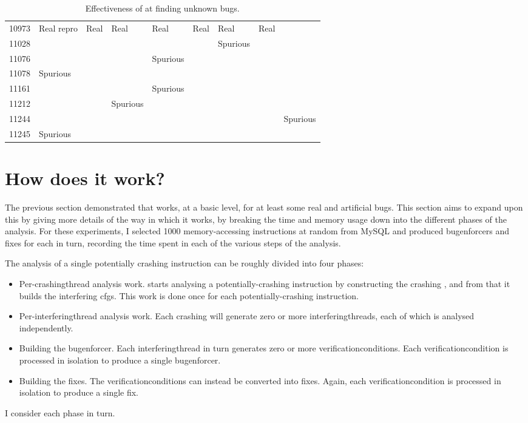 \begin{table}
\begin{tabular}{lllllllll}
10973 & Real repro   & Real         & Real         & Real        & Real          & Real         & Real \\
11028 &              &              &              &              &              & Spurious \\
11076 &              &              &              & Spurious \\
11078 & Spurious \\
11161 &              &              &              & Spurious \\
11212 &              &              & Spurious \\
11244 &              &              &              &              &              &              &              & Spurious \\
11245 & Spurious \\
\end{tabular}
\caption{Effectiveness of {\technique} at finding unknown bugs.}
\label{tab:eval:does:finding_unknown}
\end{table}

\section{How does it work?}
\label{sect:eval:how_does_it_work}

The previous section demonstrated that {\technique} works, at a basic
level, for at least some real and artificial bugs.  This section aims
to expand upon this by giving more details of the way in which it
works, by breaking the time and memory usage down into the different
phases of the analysis.  For these experiments, I selected 1000
memory-accessing instructions at random from MySQL and produced
\glspl{bugenforcer} and fixes for each in turn, recording the time
spent in each of the various steps of the analysis.

The analysis of a single potentially crashing instruction can be
roughly divided into four phases:
\begin{itemize}
\item Per-\gls{crashingthread} analysis work.  {\Technique} starts
  analysing a potentially-crashing instruction by constructing the
  crashing {\StateMachine}, and from that it builds the interfering
  \glspl{cfg}.  This work is done once for each potentially-crashing
  instruction.
\item Per-\gls{interferingthread} analysis work.  Each crashing
  {\StateMachine} will generate zero or more
  \glspl{interferingthread}, each of which is analysed independently.
\item Building the \gls{bugenforcer}.  Each \gls{interferingthread} in
  turn generates zero or more \glspl{verificationcondition}.  Each
  \gls{verificationcondition} is processed in isolation to produce a
  single \gls{bugenforcer}.
\item Building the fixes.  The \glspl{verificationcondition} can
  instead be converted into fixes.  Again, each
  \gls{verificationcondition} is processed in isolation to produce a
  single fix.
\end{itemize}
I consider each phase in turn.

